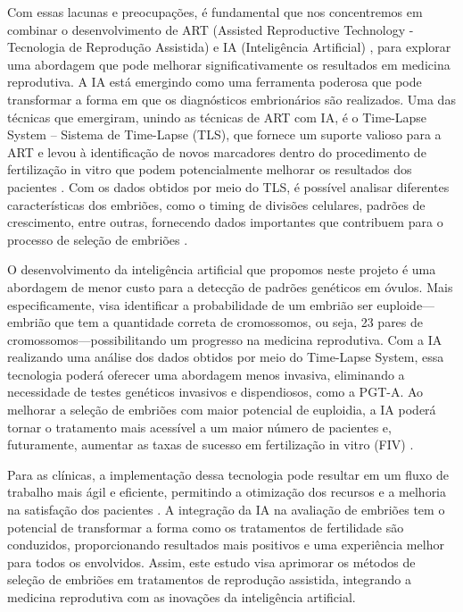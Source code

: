 Com essas lacunas e preocupações, é fundamental que nos concentremos em combinar o desenvolvimento de ART (Assisted Reproductive Technology - Tecnologia de Reprodução Assistida) e IA (Inteligência Artificial) \cite{wang2019}, para explorar uma abordagem que pode melhorar significativamente os resultados em medicina reprodutiva. A IA está emergindo como uma ferramenta poderosa que pode transformar a forma em que os diagnósticos embrionários são realizados. Uma das técnicas que emergiram, unindo as técnicas de ART com IA, é o Time-Lapse System – Sistema de Time-Lapse (TLS), que fornece um suporte valioso para a ART e levou à identificação de novos marcadores dentro do procedimento de fertilização in vitro que podem potencialmente melhorar os resultados dos pacientes \cite{luong2023}. Com os dados obtidos por meio do TLS, é possível analisar diferentes características dos embriões, como o timing de divisões celulares, padrões de crescimento, entre outras, fornecendo dados importantes que contribuem para o processo de seleção de embriões \cite{luong2023}. 

O desenvolvimento da inteligência artificial que propomos neste projeto é uma abordagem de menor custo para a detecção de padrões genéticos em óvulos. Mais especificamente, visa identificar a probabilidade de um embrião ser euploide—embrião que tem a quantidade correta de cromossomos, ou seja, 23 pares de cromossomos—possibilitando um progresso na medicina reprodutiva. Com a IA realizando uma análise dos dados obtidos por meio do Time-Lapse System, essa tecnologia poderá oferecer uma abordagem menos invasiva, eliminando a necessidade de testes genéticos invasivos e dispendiosos, como a PGT-A. Ao melhorar a seleção de embriões com maior potencial de euploidia, a IA poderá tornar o tratamento mais acessível a um maior número de pacientes e, futuramente, aumentar as taxas de sucesso em fertilização in vitro (FIV) \cite{ramalho2024}. 

Para as clínicas, a implementação dessa tecnologia pode resultar em um fluxo de trabalho mais ágil e eficiente, permitindo a otimização dos recursos e a melhoria na satisfação dos pacientes \cite{ramalho2024}. A integração da IA na avaliação de embriões tem o potencial de transformar a forma como os tratamentos de fertilidade são conduzidos, proporcionando resultados mais positivos e uma experiência melhor para todos os envolvidos. Assim, este estudo visa aprimorar os métodos de seleção de embriões em tratamentos de reprodução assistida, integrando a medicina reprodutiva com as inovações da inteligência artificial.



